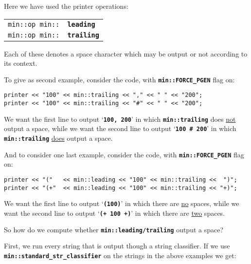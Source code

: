 \documentclass[12pt]{article}
\makeatletter
\newcommand{\TT}[1]{{\tt \bfseries #1}}
\newcommand{\ttindex}[1]{\index{#1@{\tt #1}}}
\newcommand{\EOL}{\penalty \exhyphenpenalty}
\newenvironment{indpar}[1][0.3in]%
	{\begin{list}{}%
		     {\setlength{\itemsep}{0in}%
		      \setlength{\topsep}{0in}%
		      \setlength{\parsep}{1ex}%
		      \setlength{\labelwidth}{#1}%
		      \setlength{\leftmargin}{#1}%
		      \addtolength{\leftmargin}{\labelsep}}%
	 \item}%
	{\end{list}}
\newcommand{\LABEL}[1]{\label{#1}}
\newcommand{\MINKEY}[1]%
	   {\TT{#1}\ttindex{min::#1}\ttindex{#1}}
\makeatother
\begin{document}
Here we have used the printer operations:

\begin{indpar}[1em]\begin{tabular}{r@{}l}
\verb|min::op min::| & \MINKEY{leading}
\LABEL{MIN::LEADING} \\
\verb|min::op min::| & \MINKEY{trailing}
\LABEL{MIN::TRAILING} \\
\end{tabular}\end{indpar}

Each of these denotes a space character which may be output or
not according to its context.

To give as second example,
consider the code, with \TT{min::\EOL FORCE\_\EOL PGEN} flag on:
\begin{indpar}\begin{verbatim}
printer << "100" << min::trailing << "," << " " << "200";
printer << "100" << min::trailing << "#" << " " << "200";
\end{verbatim}\end{indpar}

We want the first line to output `\TT{100, 200}' in which
\TT{min::\EOL trailing} does \underline{not} output a space,
while we want the second line to output `\TT{100 \# 200}'
in which \TT{min::\EOL trailing} \underline{does} output a space.

And to consider one last example,
consider the code, with \TT{min::\EOL FORCE\_\EOL PGEN} flag on:
\begin{indpar}\begin{verbatim}
printer << "("   << min::leading << "100" << min::trailing <<  ")";
printer << "(+"  << min::leading << "100" << min::trailing << "+)";
\end{verbatim}\end{indpar}

We want the first line to output `\TT{(100)}' in which there are
\underline{no} spaces,
while we want the second line to output `\TT{(+ 100 +)}'
in which there are \underline{two} spaces.

So how do we compute whether \TT{min::leading/trailing} output
a space? 

First, we run every string that is output though a string classifier.
If we use \TT{min::\EOL standard\_\EOL str\_\EOL classifier} on the
strings in the above examples we get:
\end{document}
